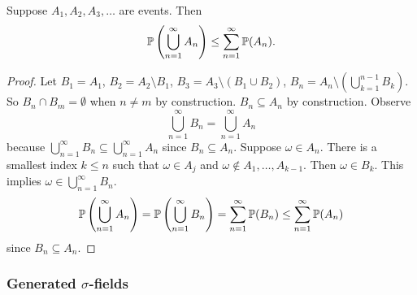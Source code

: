 \documentclass[10pt, a4paper]{article}
\begin{document}
\begin{proposition}
    Suppose $A_1, A_2, A_3, \dotsc$ are events.
    Then
    \[
    \P\left(\bigcup_{n = 1}^{\infty}A_n\right) \leq \sum_{n = 1}^{\infty}\P(A_n).
    \]

    \begin{proof}
        Let $B_1 = A_1$,
        $B_2 = A_2 \setminus B_1$,
        $B_3 = A_3 \setminus (B_1 \cup B_2)$,
        $B_n = A_n \setminus \left(\bigcup_{k = 1}^{n - 1}B_k\right)$.
        So $B_n \cap B_m = \emptyset$ when $n \neq m$ by construction.
        $B_n \subseteq A_n$ by construction.
        Observe
        \[
        \bigcup_{n = 1}^{\infty}B_n = \bigcup_{n = 1}^{\infty}A_n
        \]
        because $\bigcup_{n = 1}^{\infty}B_n \subseteq \bigcup_{n = 1}^{\infty}A_n$ since $B_n \subseteq A_n$.
        Suppose $\omega \in A_n$.
        There is a smallest index $k \leq n$ such that $\omega \in A_j$ and $\omega \notin A_1, \dotsc, A_{k - 1}$.
        Then $\omega \in B_k$.
        This implies $\omega \in \bigcup_{n = 1}^{\infty}B_n$.
        \[
        \P\left(\bigcup_{n = 1}^{\infty}A_n\right) = \P\left(\bigcup_{n = 1}^{\infty}B_n\right) = \sum_{n = 1}^{\infty}\P(B_n) \leq \sum_{n = 1}^{\infty}\P(A_n)
        \]
        since $B_n \subseteq A_n$.
    \end{proof}
\end{proposition}

\subsubsection{Generated \texorpdfstring{$\sigma$}{}-fields}
\end{document}
